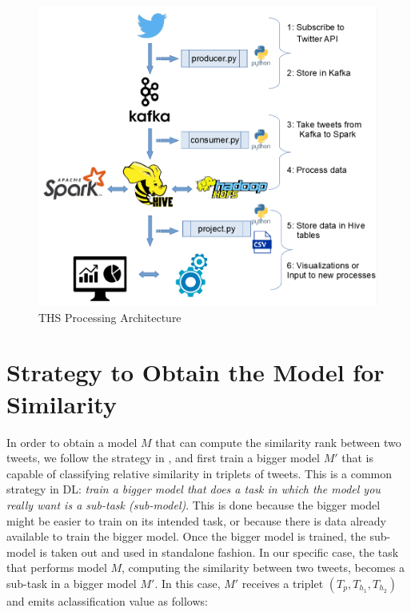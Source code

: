 \documentclass[12pt]{report}
\begin{document}
\begin{figure}[H]	
	\centering
	\includegraphics[width=150mm, scale = 1]{images/6_ths_system.png}	
	\caption{\ac{THS} Processing Architecture}	
	\label{figure:ths_system}
\end{figure}

\section{Strategy to Obtain the Model for Similarity \label{strategy}}
In order to obtain a model $M$ that can compute the similarity rank between two tweets, we follow the strategy in \cite{Wang2014}, and first train a bigger model $M'$
that is capable of classifying relative similarity in triplets of tweets. This is a common strategy in \ac{DL}: {\em train a bigger model that does a task in which the model you really want is  
	a sub-task (sub-model)}. This is done because the bigger model might be easier to train on its intended task, or because there is data already available to train the bigger model.  Once the bigger model is trained, the sub-model is taken out and used in standalone fashion. In our specific case, the task that performs model $M$, computing the similarity between two tweets, becomes a sub-task in a bigger
model $M'$. In this case, $M'$ receives a triplet $(T_p, T_{h_1}, T_{h_2})$ and emits aclassification value as follows: 
\end{document}
